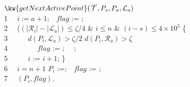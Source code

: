 {{\begin{algorithm}[tb!]
\begin{small}
 $\kw{getNextActivePoint}(\dddot{\mathcal{T}}, P_s, P_a, \mathcal{L}_a)$\\
1   ~~$i := a+1$;\ \ $flag$ := \True; \\
2  ~~\While($(|\mathcal{R}_i| - |\mathcal{L}_a|) \le \zeta/4$ \& $i\le n$ \&  $(i-s)\le 4\times 10^5$ \Do\{\\
3   ~~~~~\If $d(P_i, \mathcal{L}_a) > \zeta/2$ \Or $d(P_i, \mathcal{R}_a) > \zeta$ \Then \\
4   ~~~~~~~ $flag$ := \False; \ \ \Break; \\
5   ~~~~~$i$ := $i + 1$; \}\\  %
6   ~~\If $i = n + 1$  \Then $P_i$ :=;\ \ $flag$ := \False; \\
7   ~~\Return $(P_i, flag)$.
\end{small}
\end{algorithm}
}%


}
